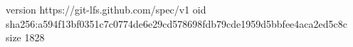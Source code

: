 version https://git-lfs.github.com/spec/v1
oid sha256:a594f13bf0351c7c0774de6e29cd578698fdb79cde1959d5bbfee4aca2ed5c8c
size 1828

